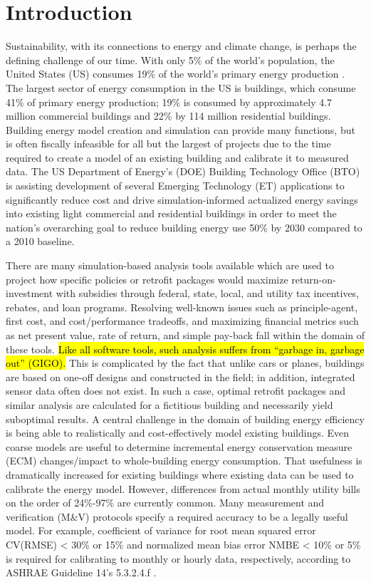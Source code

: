 \documentclass[preprint, review, 12pt]{elsarticle}
\begin{document}
\section{Introduction}
\label{sec:introduction}
Sustainability, with its connections to energy and climate change, is perhaps the defining challenge of our time. With only 5\% of the world's population, the United States (US) consumes 19\% of the world's primary energy production \cite{cit:doe2012a}. The largest sector of energy consumption in the US is buildings, which consume 41\% of primary energy production; 19\% is consumed by approximately 4.7 million commercial buildings and 22\% by 114 million residential buildings. Building energy model creation and simulation can provide many functions, but is often fiscally infeasible for all but the largest of projects due to the time required to create a model of an existing building and calibrate it to measured data. The US Department of Energy's (DOE) Building Technology Office (BTO) is assisting development of several Emerging Technology (ET) applications to significantly reduce cost and drive simulation-informed actualized energy savings into existing light commercial and residential buildings in order to meet the nation’s overarching goal to reduce building energy use 50\% by 2030 compared to a 2010 baseline.

There are many simulation-based analysis tools available which are used to project how specific policies or retrofit packages would maximize return-on-investment with subsidies through federal, state, local, and utility tax incentives, rebates, and loan programs. Resolving well-known issues such as principle-agent, first cost, and cost/performance tradeoffs, and maximizing financial metrics such as net present value, rate of return, and simple pay-back fall within the domain of these tools. \hl{Like all software tools, such analysis suffers from ``garbage in, garbage out'' (GIGO).} This is complicated by the fact that unlike cars or planes, buildings are based on one-off designs and constructed in the field; in addition, integrated sensor data often does not exist. In such a case, optimal retrofit packages and similar analysis are calculated for a fictitious building and necessarily yield suboptimal results. A central challenge in the domain of building energy efficiency is being able to realistically and cost-effectively model existing buildings. Even coarse models are useful to determine incremental energy conservation measure (ECM) changes/impact to whole-building energy consumption. That usefulness is dramatically increased for existing buildings where existing data can be used to calibrate the energy model. However, differences from actual monthly utility bills on the order of 24\%-97\% \cite{cit:earthadvantage2009,cit:roberts2012} are currently common. Many measurement and verification (M\&V) protocols specify a required accuracy to be a legally useful model. For example, coefficient of variance for root mean squared error CV(RMSE) < 30\% or 15\% and normalized mean bias error NMBE < 10\% or 5\% is required for calibrating to monthly or hourly data, respectively, according to ASHRAE Guideline 14's 5.3.2.4.f \cite{cit:ashrae2002}.
\end{document}
